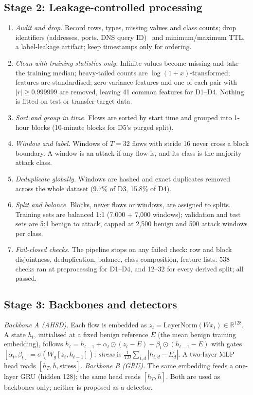 \documentclass[conference]{IEEEtran}
\begin{document}
\subsection{Stage 2: Leakage-controlled processing}
\begin{enumerate}
\item \emph{Audit and drop.} Record rows, types, missing values and class counts; drop identifiers (addresses, ports, DNS query ID)~\cite{dhooge2022} and minimum/maximum TTL, a label-leakage artifact; keep timestamps only for ordering.
\item \emph{Clean with training statistics only.} Infinite values become missing and take the training median; heavy-tailed counts are $\log(1+x)$-transformed; features are standardised; zero-variance features and one of each pair with $|r|\geq0.999999$ are removed, leaving 41 common features for D1--D4. Nothing is fitted on test or transfer-target data.
\item \emph{Sort and group in time.} Flows are sorted by start time and grouped into 1-hour blocks (10-minute blocks for D5's purged split).
\item \emph{Window and label.} Windows of $T{=}32$ flows with stride 16 never cross a block boundary. A window is an attack if any flow is, and its class is the majority attack class.
\item \emph{Deduplicate globally.} Windows are hashed and exact duplicates removed across the whole dataset (9.7\% of D3, 15.8\% of D4).
\item \emph{Split and balance.} Blocks, never flows or windows, are assigned to splits. Training sets are balanced 1:1 (7,000 + 7,000 windows); validation and test sets are 5:1 benign to attack, capped at 2,500 benign and 500 attack windows per class.
\item \emph{Fail-closed checks.} The pipeline stops on any failed check: row and block disjointness, deduplication, balance, class composition, feature lists. 538 checks ran at preprocessing for D1--D4, and 12--32 for every derived split; all passed.
\end{enumerate}

\subsection{Stage 3: Backbones and detectors}
\emph{Backbone A (AHSD).} Each flow is embedded as $z_t=\mathrm{LayerNorm}(Wx_t)\in\mathbb{R}^{128}$. A state $h_t$, initialised at a fixed benign reference $E$ (the mean benign training embedding), follows $h_t = h_{t-1} + \alpha_t\odot(z_t-E) - \beta_t\odot(h_{t-1}-E)$ with gates $[\alpha_t,\beta_t]=\sigma(W_g[z_t,h_{t-1}])$; \emph{stress} is $\frac{1}{TD}\sum_{t,d}|h_{t,d}-E_d|$. A two-layer MLP head reads $[h_T, \bar h, \text{stress}]$.
\emph{Backbone B (GRU).} The same embedding feeds a one-layer GRU (hidden 128); the same head reads $[h_T,\bar h]$. Both are used as backbones only; neither is proposed as a detector.
\end{document}
